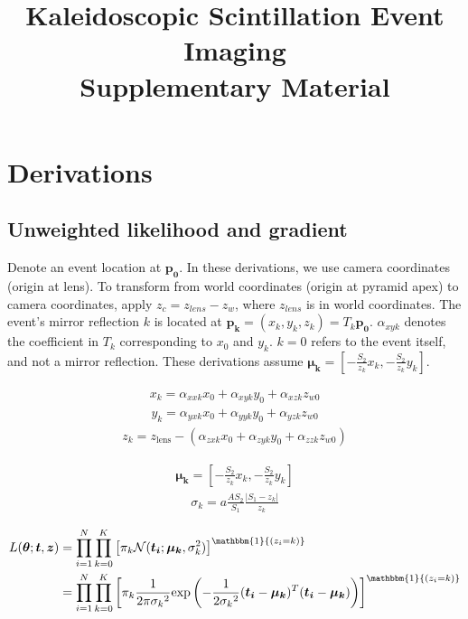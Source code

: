 \documentclass{article}
\begin{document}
\title{Kaleidoscopic Scintillation Event Imaging \\
\large Supplementary Material}

\date{}

\maketitle

\section{Derivations}
\subsection{Unweighted likelihood and gradient} \label{sec:like}

Denote an event location at $\bm{p_0}$.
In these derivations, we use camera coordinates (origin at lens). 
To transform from world coordinates (origin at pyramid apex) to camera 
coordinates, apply $z_c = z_{lens} - z_w$, where $z_{lens}$ is in world coordinates.
The event's mirror reflection $k$ is located at $\bm{p_k}=(x_k,y_k,z_k)=T_k\bm{p_0}$.
$\alpha_{xyk}$ denotes the coefficient in $T_k$ corresponding to $x_0$ and $y_k$.
$k=0$ refers to the event itself, and not a mirror reflection.
These derivations assume $\bm{\mu_k} = \left[-\frac{S_2}{z_k} x_k, -\frac{S_2}{z_k} y_k\right]$. 



\begin{align}
x_k = \alpha_{xxk}x_0 + \alpha_{xyk}y_0 + \alpha_{xzk}z_{w0}
\end{align}
\begin{align}
y_k = \alpha_{yxk}x_0 + \alpha_{yyk}y_0 + \alpha_{yzk}z_{w0}
\end{align}
\begin{align}
z_k = z_\text{lens} - (\alpha_{zxk}x_0 + \alpha_{zyk}y_0 + \alpha_{zzk}z_{w0})
\end{align}


\begin{align}
\bm{\mu_k} = \left[-\frac{S_2}{z_k} x_k, -\frac{S_2}{z_k} y_k\right]
\end{align}
\begin{align}
\sigma_k = a \frac{AS_2}{S_1} \frac{|S_1-z_k|}{z_k}
\end{align}


\begin{align}
L(\bm{\theta};\bm{t},\bm{z}) &= \prod_{i=1}^N \prod_{k=0}^K \left[ \pi_k \mathcal{N}(\bm{t_i};\bm{\mu_k},\sigma_k^2) \right]^{\mathbbm{1}{(z_i=k)}} \\
&= \prod_{i=1}^N \prod_{k=0}^K \left[ \pi_k \frac{1}{2\pi{\sigma_k}^2} \text{exp}\left( -\frac{1}{2{\sigma_k}^2} (\bm{t_i}-\bm{\mu_k})^T(\bm{t_i}-\bm{\mu_k}) \right) \right]^{\mathbbm{1}{(z_i=k)}}
\end{align}
\end{document}

